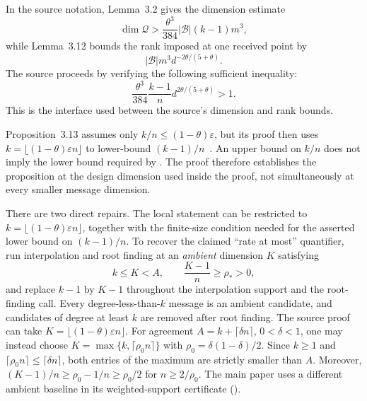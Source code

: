 \documentclass[11pt,letterpaper]{article}
\theoremstyle{definition}
\newcommand{\Qspace}{\mathcal{Q}}
\begin{document}
In the source notation, Lemma~3.2 gives the dimension estimate
\begin{equation}
  \dim\Qspace>
  \frac{\theta^3}{384}|\mathcal B|(k-1)m^3,
  \label{eq:source-dimension-lower-bound}
\end{equation}
while Lemma~3.12 bounds the rank imposed at one received point by
\begin{equation}
  |\mathcal B|m^3d^{-2\theta/(5+\theta)}.
  \label{eq:source-local-rank-bound}
\end{equation}
The source proceeds by verifying the following sufficient inequality:
\begin{equation}
  \frac{\theta^3}{384}\frac{k-1}{n}
  d^{2\theta/(5+\theta)}>1.
  \label{eq:source-required-dimension-inequality}
\end{equation}
This is the interface used between the source's dimension and rank bounds.

Proposition~3.13 assumes only
\(k/n\leq(1-\theta)\varepsilon\), but its proof then uses
\(k=\lfloor(1-\theta)\varepsilon n\rfloor\) to lower-bound
\((k-1)/n\)~\cite[Section 3.3, Proposition 3.13]{BCPZZ26}.  An upper bound on
\(k/n\) does not imply the lower bound required by
.  The proof therefore
establishes the proposition at the design dimension used inside the proof,
not simultaneously at every smaller message dimension.

There are two direct repairs.  The local statement can be restricted to
\(k=\lfloor(1-\theta)\varepsilon n\rfloor\), together with the finite-size
condition needed for the asserted lower bound on \((k-1)/n\).  To recover the
claimed ``rate at most'' quantifier, run interpolation and root finding at an
\emph{ambient} dimension \(K\) satisfying
\begin{equation}
  k\leq K<A,
  \qquad
  \frac{K-1}{n}\geq\rho_*>0,
  \label{eq:source-ambient-repair-conditions}
\end{equation}
and replace \(k-1\) by \(K-1\) throughout the interpolation support and the
root-finding call.  Every degree-less-than-\(k\) message is an ambient
candidate, and candidates of degree at least \(k\) are removed after root
finding.  The source proof can take
\(K=\lfloor(1-\theta)\varepsilon n\rfloor\).  For agreement $A=k+\lceil\delta n\rceil$, $0<\delta<1$, one may instead
choose $K=\max\{k,\lceil\rho_0n\rceil\}$ with
$\rho_0=\delta(1-\delta)/2$. Since $k\ge1$ and
$\lceil\rho_0n\rceil\le\lceil\delta n\rceil$, both entries of the maximum
are strictly smaller than $A$. Moreover,
$(K-1)/n\ge\rho_0-1/n\ge\rho_0/2$ for $n\ge2/\rho_0$.
The main paper uses a different ambient baseline in
its weighted-support certificate ().
\end{document}
